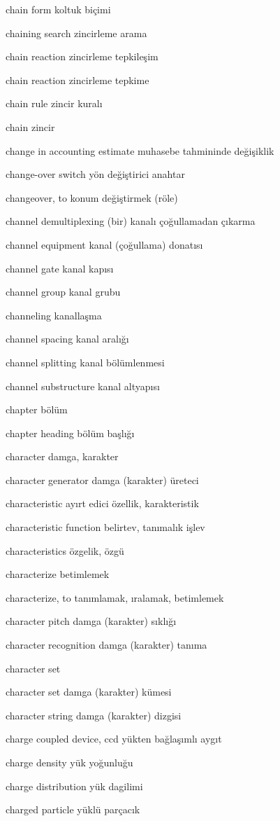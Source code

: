 \documentclass[12pt,fleqn]{article}\usepackage{../../common}
\begin{document}
chain form koltuk biçimi

chaining search zincirleme arama

chain reaction zincirleme tepkileşim

chain reaction zincirleme tepkime

chain rule zincir kuralı

chain zincir

change in accounting estimate muhasebe tahmininde değişiklik

change-over switch yön değiştirici anahtar

changeover, to konum değiştirmek (röle)

channel demultiplexing (bir) kanalı çoğullamadan çıkarma

channel equipment kanal (çoğullama) donatısı

channel gate kanal kapısı

channel group kanal grubu

channeling kanallaşma

channel spacing kanal aralığı

channel splitting kanal bölümlenmesi

channel substructure kanal altyapısı

chapter bölüm

chapter heading bölüm başlığı

character damga, karakter

character generator damga (karakter) üreteci

characteristic ayırt edici özellik, karakteristik

characteristic function belirtev, tanımalık işlev

characteristics özgelik, özgü

characterize betimlemek

characterize, to tanımlamak, ıralamak, betimlemek

character pitch damga (karakter) sıklığı

character recognition damga (karakter) tanıma

character set

character set damga (karakter) kümesi

character string damga (karakter) dizgisi

charge coupled device, ccd yükten bağlaşımlı aygıt

charge density yük yoğunluğu

charge distribution yük dagilimi

charged particle yüklü parçacık
\end{document}
